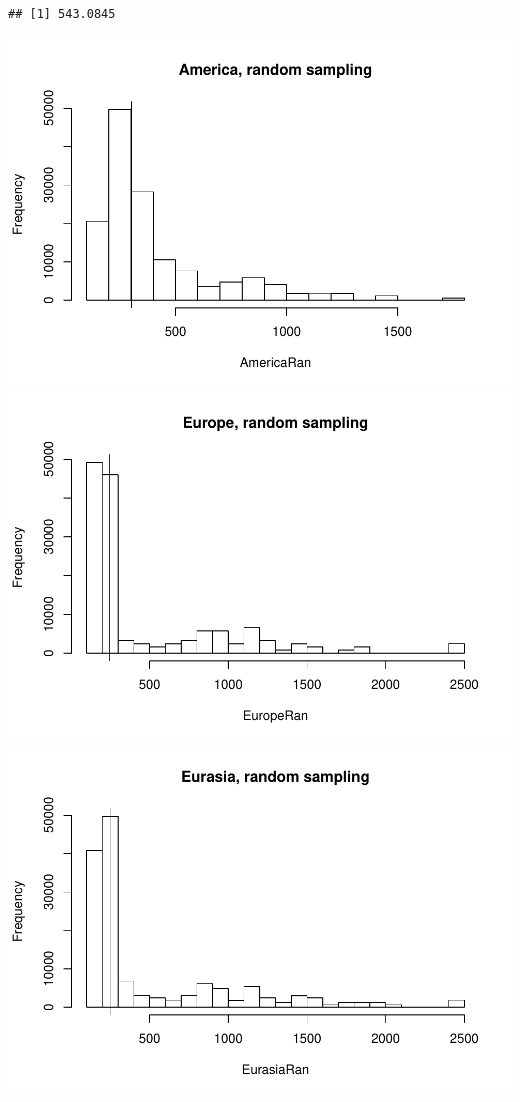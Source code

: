 \documentclass[]{article}
\begin{document}
\begin{verbatim}
## [1] 543.0845
\end{verbatim}

\includegraphics{MA_JJ_files/figure-latex/RSCon-1.pdf}
\includegraphics{MA_JJ_files/figure-latex/RSCon-2.pdf}
\includegraphics{MA_JJ_files/figure-latex/RSCon-3.pdf}
\end{document}
